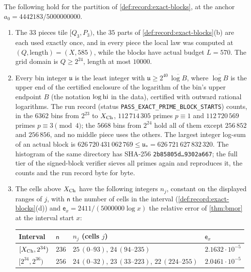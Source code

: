\begin{certificate}\label{cert:record:middle-price}
The following hold for the partition of \cref{def:record:exact-blocks}, at
the anchor $a_0=4442183/5000000000$.
\begin{enumerate}[label=(\alph*)]
\item The $33$ pieces tile $[Q_3,P_3)$, the $35$ parts of
 \cref{def:record:exact-blocks}(b) are each used exactly once, and in every piece the local law was computed at
 $(Q,\text{length})=(X,585)$, while the blocks have actual budget $L=570$. The
 grid domain is $Q\ge2^{24}$, length at most $10000$.
\item Every bin integer $\mathfrak u$ is the least integer
 with $\mathfrak u\ge2^{40}\,\overline{\log B}$, where
 $\overline{\log B}$ is the upper end of the certified enclosure
 of the logarithm of the bin's upper endpoint $B$ (the notation
 $\log{\rm hi}$ in the data), certified with outward rational
 logarithms. The run record
 (status \texttt{PASS\_EXACT\_PRIME\_BLOCK\_STARTS}) counts, in the $6362$
 bins from $2^{23}$ to $X_{\rm Ch}$, $112\,714\,305$ primes $p\equiv1$ and
 $112\,720\,569$ primes $p\equiv3\pmod4$; the $5668$ bins from $2^{24}$ hold
 all of them except $256\,852$ and $256\,856$, and no middle piece uses the
 others. The largest integer log-sum of an actual block is
 $626\,720\,431\,062\,769\le\mathfrak u_*=626\,721\,627\,832\,320$. The
 histogram  of the same directory has SHA-256
 \texttt{2b85805d\ldots9302a667}; the full tier of the signed-block verifier
 sieves all primes again and reproduces it, the counts and the run record byte
 for byte.
\item The cells above $X_{\rm Ch}$ have the following integers $n_j$,
 constant on the displayed ranges of $j$, with $\mathsf n$ the
 number of cells in the interval
 (\cref{def:record:exact-blocks}(d)) and
 $\mathsf e_x=2411/(5000000\log x)$ the relative error of
 \cref{thm:bmor} at the interval start $x$:
 \begin{center}
 \small
 \begin{tabular}{@{}llll@{}}
 \toprule
 Interval & $\mathsf n$ & $n_j$ (cells $j$) & $\mathsf e_x$\\
 \midrule
 $[X_{\rm Ch},2^{34})$ & $236$ & $25\,(0\text{--}93)$, $24\,(94\text{--}235)$ & $2.1632\cdot10^{-5}$\\
 $[2^{34},2^{36})$ & $256$ & $24\,(0\text{--}32)$, $23\,(33\text{--}223)$, $22\,(224\text{--}255)$ & $2.0461\cdot10^{-5}$\\

\end{tabular}
\end{center}
\end{enumerate}
\end{certificate}
